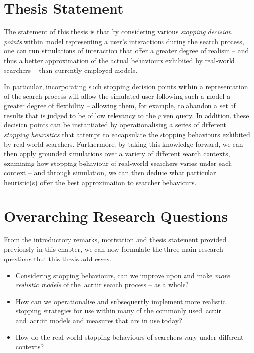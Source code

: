 \vspace{-5mm}
\section{Thesis Statement}
The statement of this thesis is that by considering various \emph{stopping decision points} within model representing a user's interactions during the search process, one can run simulations of interaction that offer a greater degree of realism -- and thus a better approximation of the actual behaviours exhibited by real-world searchers -- than currently employed models.

In particular, incorporating such stopping decision points within a representation of the search process will allow the simulated user following such a model a greater degree of flexibility -- allowing them, for example, to abandon a set of results that is judged to be of low relevancy to the given query. In addition, these decision points can be instantiated by operationalising a series of different \emph{stopping heuristics} that attempt to encapsulate the stopping behaviours exhibited by real-world searchers. Furthermore, by taking this knowledge forward, we can then apply grounded simulations over a variety of different search contexts, examining how stopping behaviour of real-world searchers varies under each context -- and through simulation, we can then deduce what particular heuristic(s) offer the best approximation to searcher behaviours.

\section{Overarching Research Questions}
From the introductory remarks, motivation and thesis statement provided previously in this chapter, we can now formulate the three main research questions that this thesis addresses. 

\begin{itemize}

    \item[]{ Considering stopping behaviours, can we improve upon and make \emph{more realistic models} of the~\gls{acr:iir} search process -- as a whole?}

    \item[]{ How can we operationalise and subsequently implement more realistic stopping strategies for use within many of the commonly used~\gls{acr:ir} and~\gls{acr:iir} models and measures that are in use today?}

    \item[]{ How do the real-world stopping behaviours of searchers vary under different contexts?}

\end{itemize}

